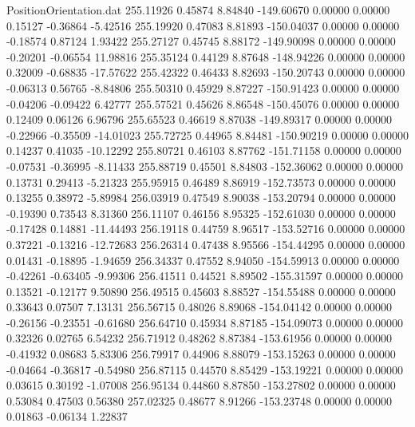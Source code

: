 \begin{filecontents}{PositionOrientation.dat}
 255.11926    0.45874    8.84840  -149.60670    0.00000    0.00000    0.15127   -0.36864   -5.42516
 255.19920    0.47083    8.81893  -150.04037    0.00000    0.00000   -0.18574    0.87124    1.93422
 255.27127    0.45745    8.88172  -149.90098    0.00000    0.00000   -0.20201   -0.06554   11.98816
 255.35124    0.44129    8.87648  -148.94226    0.00000    0.00000    0.32009   -0.68835  -17.57622
 255.42322    0.46433    8.82693  -150.20743    0.00000    0.00000   -0.06313    0.56765   -8.84806
 255.50310    0.45929    8.87227  -150.91423    0.00000    0.00000   -0.04206   -0.09422    6.42777
 255.57521    0.45626    8.86548  -150.45076    0.00000    0.00000    0.12409    0.06126    6.96796
 255.65523    0.46619    8.87038  -149.89317    0.00000    0.00000   -0.22966   -0.35509  -14.01023
 255.72725    0.44965    8.84481  -150.90219    0.00000    0.00000    0.14237    0.41035  -10.12292
 255.80721    0.46103    8.87762  -151.71158    0.00000    0.00000   -0.07531   -0.36995   -8.11433
 255.88719    0.45501    8.84803  -152.36062    0.00000    0.00000    0.13731    0.29413   -5.21323
 255.95915    0.46489    8.86919  -152.73573    0.00000    0.00000    0.13255    0.38972   -5.89984
 256.03919    0.47549    8.90038  -153.20794    0.00000    0.00000   -0.19390    0.73543    8.31360
 256.11107    0.46156    8.95325  -152.61030    0.00000    0.00000   -0.17428    0.14881  -11.44493
 256.19118    0.44759    8.96517  -153.52716    0.00000    0.00000    0.37221   -0.13216  -12.72683
 256.26314    0.47438    8.95566  -154.44295    0.00000    0.00000    0.01431   -0.18895   -1.94659
 256.34337    0.47552    8.94050  -154.59913    0.00000    0.00000   -0.42261   -0.63405   -9.99306
 256.41511    0.44521    8.89502  -155.31597    0.00000    0.00000    0.13521   -0.12177    9.50890
 256.49515    0.45603    8.88527  -154.55488    0.00000    0.00000    0.33643    0.07507    7.13131
 256.56715    0.48026    8.89068  -154.04142    0.00000    0.00000   -0.26156   -0.23551   -0.61680
 256.64710    0.45934    8.87185  -154.09073    0.00000    0.00000    0.32326    0.02765    6.54232
 256.71912    0.48262    8.87384  -153.61956    0.00000    0.00000   -0.41932    0.08683    5.83306
 256.79917    0.44906    8.88079  -153.15263    0.00000    0.00000   -0.04664   -0.36817   -0.54980
 256.87115    0.44570    8.85429  -153.19221    0.00000    0.00000    0.03615    0.30192   -1.07008
 256.95134    0.44860    8.87850  -153.27802    0.00000    0.00000    0.53084    0.47503    0.56380
 257.02325    0.48677    8.91266  -153.23748    0.00000    0.00000    0.01863   -0.06134    1.22837

\end{filecontents}
